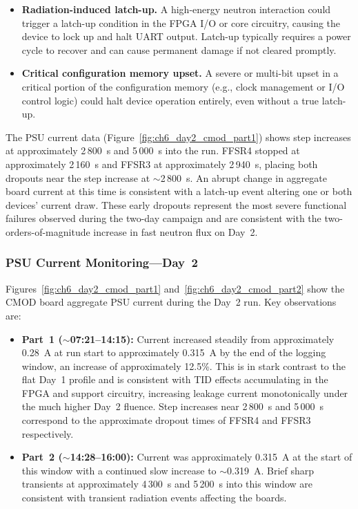 \begin{itemize}
    \item \textbf{Radiation-induced latch-up.}  A high-energy neutron
    interaction could trigger a latch-up condition in the FPGA I/O or
    core circuitry, causing the device to lock up and halt UART output.
    Latch-up typically requires a power cycle to recover and can cause
    permanent damage if not cleared promptly.

    \item \textbf{Critical configuration memory upset.}  A severe or
    multi-bit upset in a critical portion of the configuration memory
    (e.g., clock management or I/O control logic) could halt device
    operation entirely, even without a true latch-up.
\end{itemize}

The PSU current data
(Figure~\ref{fig:ch6_day2_cmod_part1}) shows step increases at
approximately 2\,800~s and 5\,000~s into the run.  FFSR4 stopped at
approximately 2\,160~s and FFSR3 at approximately 2\,940~s, placing both
dropouts near the step increase at $\sim$2\,800~s.  An abrupt change in
aggregate board current at this time is consistent with a latch-up event
altering one or both devices' current draw.  These early dropouts
represent the most severe functional failures observed during the
two-day campaign and are consistent with the two-orders-of-magnitude
increase in fast neutron flux on Day~2.

\subsubsection{PSU Current Monitoring---Day~2}
\label{subsec:ch6_day2_psu}

Figures~\ref{fig:ch6_day2_cmod_part1}
and~\ref{fig:ch6_day2_cmod_part2} show the CMOD board aggregate PSU
current during the Day~2 run.  Key observations are:

\begin{itemize}
    \item \textbf{Part~1 ($\sim$07:21--14:15):}  Current increased
    steadily from approximately 0.28~A at run start to approximately
    0.315~A by the end of the logging window, an increase of
    approximately 12.5\%.  This is in stark contrast to the flat Day~1
    profile and is consistent with TID effects accumulating in the FPGA
    and support circuitry, increasing leakage current monotonically
    under the much higher Day~2 fluence.  Step increases near 2\,800~s
    and 5\,000~s correspond to the approximate dropout times of FFSR4
    and FFSR3 respectively.

    \item \textbf{Part~2 ($\sim$14:28--16:00):}  Current was
    approximately 0.315~A at the start of this window with a continued
    slow increase to $\sim$0.319~A.  Brief sharp transients at
    approximately 4\,300~s and 5\,200~s into this window are consistent
    with transient radiation events affecting the boards.
\end{itemize}


